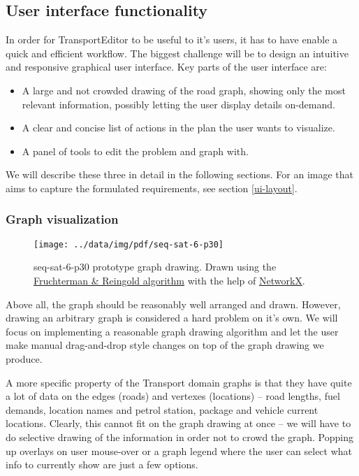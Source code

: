 \documentclass[10pt,a4paper,oneside]{article}
\newcommand{\pname}{TransportEditor} %
\begin{document}
\subsection{User interface functionality} \label{ui}

In order for \pname{} to be useful to it's users, it has to have enable a quick and efficient workflow.
The biggest challenge will be to design an intuitive and responsive graphical user interface.
Key parts of the user interface are:
\begin{itemize}
\item A large and not crowded drawing of the road graph, showing only the most relevant information, possibly letting the user display details on-demand.
\item A clear and concise list of actions in the plan the user wants to visualize.
\item A panel of tools to edit the problem and graph with.
\end{itemize}

We will describe these three in detail in the following sections. For an image that aims to capture the formulated requirements, see section \ref{ui-layout}.

\subsubsection{Graph visualization} \label{graphviz}

\begin{wrapfigure}{r}{0.5\textwidth}
        \texttt{[image: ../data/img/pdf/seq-sat-6-p30]}
        \caption{seq-sat-6-p30 prototype graph drawing. Drawn using the
         \href{http://emr.cs.iit.edu/~reingold/force-directed.pdf}{Fruchterman \& Reingold algorithm}
         with the help of  \href{https://networkx.github.io/}{NetworkX}.}
        \label{fig:graph}
\end{wrapfigure}

Above all, the graph should be reasonably well arranged and drawn. However, drawing an arbitrary graph is considered a hard problem on it's own.
We will focus on implementing a reasonable graph drawing algorithm and let the user make manual drag-and-drop style changes on top of the graph drawing we produce.

A more specific property of the Transport domain graphs is that they have quite a lot of data on the edges (roads) and vertexes (locations) -- road lengths, fuel demands, location names and petrol station, package and vehicle current locations.
Clearly, this cannot fit on the graph drawing at once -- we will have to do selective drawing of the information in order
not to crowd the graph.
Popping up overlays on user mouse-over
or a graph legend where the user can select what info to currently show are just a few options.
\end{document}
